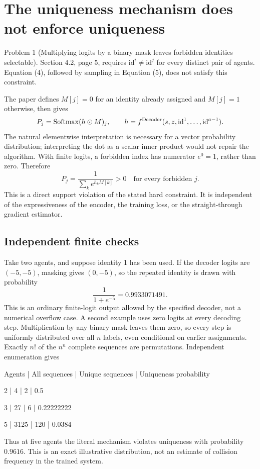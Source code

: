 \documentclass[10pt]{article}
\begin{document}
\section*{The uniqueness mechanism does not enforce uniqueness}
Problem 1 (Multiplying logits by a binary mask leaves forbidden identities selectable).  Section 4.2, page 5, requires \(\mathrm{id}^i\ne\mathrm{id}^j\) for every distinct pair of agents. Equation (4), followed by sampling in Equation (5), does not satisfy this constraint.\par
The paper defines \(M[j]=0\) for an identity already assigned and \(M[j]=1\) otherwise, then gives \[P_j=\operatorname{Softmax}(h\odot M)_j,
\qquad h=f^{\rm Decoder}(s,z,\mathrm{id}^1,\ldots,\mathrm{id}^{a-1}).\] The natural elementwise interpretation is necessary for a vector probability distribution; interpreting the dot as a scalar inner product would not repair the algorithm. With finite logits, a forbidden index has numerator \(e^0=1\), rather than zero. Therefore \[P_j=\frac1{\sum_k e^{h_kM[k]}}>0\quad\text{for every forbidden }j.\] This is a direct support violation of the stated hard constraint. It is independent of the expressiveness of the encoder, the training loss, or the straight-through gradient estimator.\par
\subsection*{Independent finite checks}
Take two agents, and suppose identity 1 has been used. If the decoder logits are \((-5,-5)\), masking gives \((0,-5)\), so the repeated identity is drawn with probability \[\frac1{1+e^{-5}}=0.9933071491.\] This is an ordinary finite-logit output allowed by the specified decoder, not a numerical overflow case. A second example uses zero logits at every decoding step. Multiplication by any binary mask leaves them zero, so every step is uniformly distributed over all \(n\) labels, even conditional on earlier assignments. Exactly \(n!\) of the \(n^n\) complete sequences are permutations. Independent enumeration gives\par
Agents | All sequences | Unique sequences | Uniqueness probability\par
2 | 4 | 2 | 0.5\par
3 | 27 | 6 | 0.22222222\par
5 | 3125 | 120 | 0.0384\par
Thus at five agents the literal mechanism violates uniqueness with probability \(0.9616\). This is an exact illustrative distribution, not an estimate of collision frequency in the trained system.\par
\end{document}
